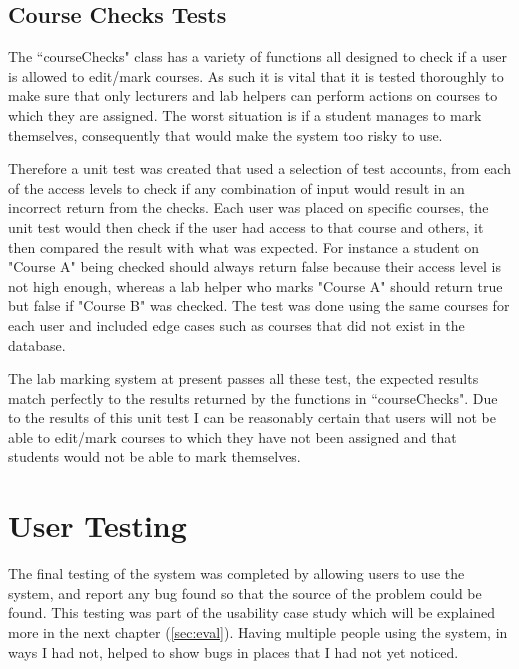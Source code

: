 \documentclass[11pt]{report}
\begin{document}
\subsection{Course Checks Tests}

The ``courseChecks" class has a variety of functions all designed to check if a user is  allowed to edit/mark courses. As such it is vital that it is tested thoroughly to make sure that only lecturers and lab helpers can perform actions on courses to which  they are assigned. The worst situation is if a student manages to mark themselves, consequently that would make the system too risky to use.

Therefore a unit test was created that used a selection of test accounts, from each of the access levels to check if any combination of input would result in an incorrect return from the checks. Each user was placed on specific courses, the unit test would then check if the user had access to that course and others, it then compared the result with what was expected. For instance a student on "Course A" being checked should always return false because their access level is not high enough, whereas a lab helper who marks "Course A" should return true but false if "Course B" was checked. The test was done using the same courses for each user and included edge cases such as courses that did not exist in the database.

The lab marking system at present passes all these test, the expected results match perfectly to the results returned by the functions in ``courseChecks". Due to the results of this unit test I can be reasonably certain that users will not be able to edit/mark courses to which they have not been assigned and that students would not be able to mark themselves. 


\section{User Testing}

The final testing of the system was completed by allowing users to use the system, and report any bug found  so that the source of the problem could be found. This testing was part of the usability case study which will be explained more in the next chapter (\ref{sec:eval}). Having multiple people using the system, in ways I had not, helped to show bugs in places that I had not yet noticed.





\end{document}
